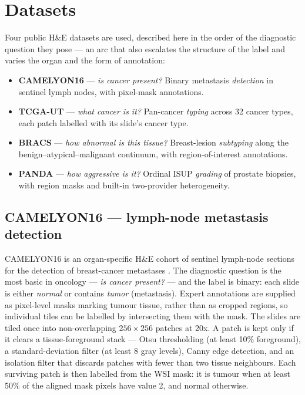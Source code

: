 \documentclass[11pt]{article}
\begin{document}
\section{Datasets}
\label{sec:datasets}
Four public H\&E datasets are used, described here in the order of the diagnostic question they
pose --- an arc that also escalates the structure of the label and varies the organ and the form of
annotation:

\begin{itemize}
  \item \textbf{CAMELYON16} --- \emph{is cancer present?} Binary metastasis \emph{detection} in
        sentinel lymph nodes, with pixel-mask annotations.
  \item \textbf{TCGA-UT} --- \emph{what cancer is it?} Pan-cancer \emph{typing} across 32 cancer types,
        each patch labelled with its slide's cancer type.
  \item \textbf{BRACS} --- \emph{how abnormal is this tissue?} Breast-lesion \emph{subtyping} along
        the benign--atypical--malignant continuum, with region-of-interest annotations.
  \item \textbf{PANDA} --- \emph{how aggressive is it?} Ordinal ISUP \emph{grading} of prostate
        biopsies, with region masks and built-in two-provider heterogeneity.
\end{itemize}

\subsection{CAMELYON16 --- lymph-node metastasis detection}
\label{sec:camelyon16}
CAMELYON16 is an organ-specific H\&E cohort of sentinel lymph-node sections for the detection of
breast-cancer metastases \citep{bejnordi2017diagnostic,litjens2018gigascience}. The diagnostic
question is the most basic in oncology --- \emph{is cancer present?} --- and the label is binary:
each slide is either \emph{normal} or contains \emph{tumor} (metastasis). Expert annotations are
supplied as pixel-level masks marking tumour tissue, rather than as cropped regions, so individual
tiles can be labelled by intersecting them with the mask. The slides are tiled once into
non-overlapping $256\times256$ patches at \num{20}x. A patch is kept only if it clears a
tissue-foreground stack --- Otsu thresholding (at least \num{10}\% foreground), a
standard-deviation filter (at least \num{8} gray levels), Canny edge detection, and an isolation
filter that discards patches with fewer than two tissue neighbours. Each surviving patch is
then labelled from the WSI mask: it is tumour when at least \num{50}\% of the aligned mask pixels
have value \num{2}, and normal otherwise.
\end{document}
